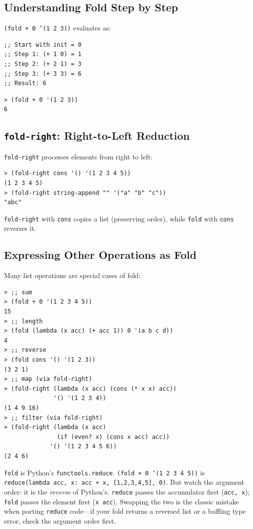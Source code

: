 \subsection{Understanding Fold Step by Step}

\texttt{(fold + 0 '(1 2 3))} evaluates as:

\begin{lstlisting}
;; Start with init = 0
;; Step 1: (+ 1 0) = 1
;; Step 2: (+ 2 1) = 3
;; Step 3: (+ 3 3) = 6
;; Result: 6
\end{lstlisting}

\begin{lstlisting}[style=repl]
> (fold + 0 '(1 2 3))
6
\end{lstlisting}

\subsection{\texttt{fold-right}: Right-to-Left Reduction}

\texttt{fold-right} processes elements from right to left:

\begin{lstlisting}[style=repl]
> (fold-right cons '() '(1 2 3 4 5))
(1 2 3 4 5)
> (fold-right string-append "" '("a" "b" "c"))
"abc"
\end{lstlisting}

\texttt{fold-right} with \texttt{cons} copies a list (preserving order), while \texttt{fold} with \texttt{cons} reverses it.

\subsection{Expressing Other Operations as Fold}

Many list operations are special cases of fold:

\begin{lstlisting}[style=repl]
> ;; sum
> (fold + 0 '(1 2 3 4 5))
15
> ;; length
> (fold (lambda (x acc) (+ acc 1)) 0 '(a b c d))
4
> ;; reverse
> (fold cons '() '(1 2 3))
(3 2 1)
> ;; map (via fold-right)
> (fold-right (lambda (x acc) (cons (* x x) acc))
              '() '(1 2 3 4))
(1 4 9 16)
> ;; filter (via fold-right)
> (fold-right (lambda (x acc)
               (if (even? x) (cons x acc) acc))
             '() '(1 2 3 4 5 6))
(2 4 6)
\end{lstlisting}

\begin{note}
\texttt{fold} is Python's \texttt{functools.reduce}. \texttt{(fold + 0 '(1 2 3 4 5))} is \texttt{reduce(lambda acc, x: acc + x, [1,2,3,4,5], 0)}. But watch the argument order: it is the \emph{reverse} of Python's. \texttt{reduce} passes the accumulator first (\texttt{acc, x}); \texttt{fold} passes the element first (\texttt{x acc}). Swapping the two is the classic mistake when porting \texttt{reduce} code---if your fold returns a reversed list or a baffling type error, check the argument order first.
\end{note}

